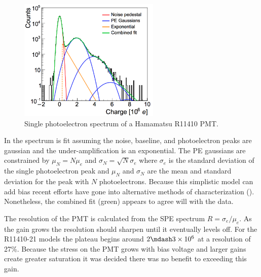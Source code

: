 \begin{figure}
\centering
\includegraphics[width=0.6\textwidth]{SPESpectrum}
\caption{Single photoelectron spectrum of a Hamamatsu R11410 PMT.}
\label{fig:xenon1t_pmt_spe}
\end{figure}

In  the spectrum is fit assuming the noise, baseline, and photoelectron peaks are gaussian and the
under-amplification is
an exponential.  The PE gaussians are constrained by $\mu_{N} = N \mu_{e}$ and $\sigma_{N} = \sqrt{N} \sigma_{e}$ where $\sigma_{e}$ is the
standard deviation of the single photoelectron peak and $\mu_{N}$ and $\sigma_{N}$ are the mean and standard deviation for the peak with
$N$ photoelectrons.  Because this simplistic model can add bias recent efforts have gone into alternative methods
of characterization ().  Nonetheless, the combined fit (green) appears to agree will with the data.

The resolution of the PMT is calculated from the SPE spectrum $R = \sigma_{e} / \mu_{e}$.  As the gain grows the resolution should sharpen
until it eventually levels off.  For the R11410-21 models the plateau begins around $2 \mdash 3 \times 10^{6}$ at a resolution of
27\%.  Because the stress on the PMT grows with bias voltage and larger gains create greater saturation it was decided there was no
benefit to exceeding this gain.

